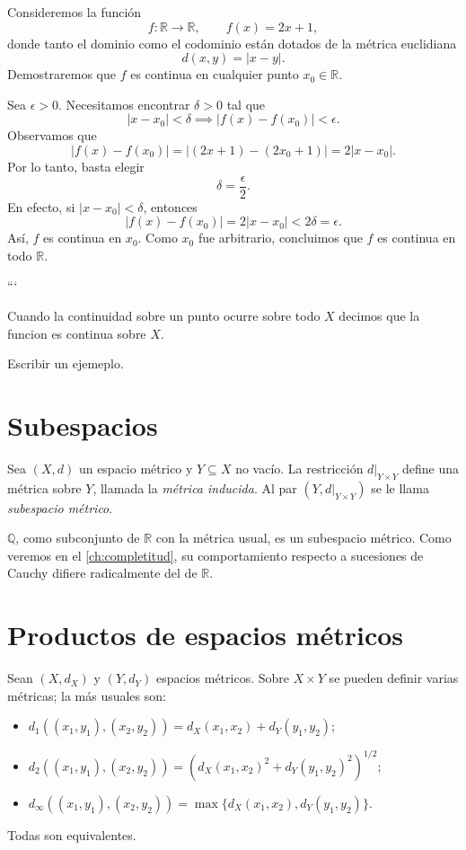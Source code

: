 \begin{example}
Consideremos la función
\[
f\colon \mathbb{R}\to\mathbb{R},
\qquad
f(x)=2x+1,
\]
donde tanto el dominio como el codominio están dotados de la métrica
euclidiana
\[
d(x,y)=|x-y|.
\]
Demostraremos que $f$ es continua en cualquier punto $x_0\in\mathbb{R}$.

Sea $\epsilon>0$. Necesitamos encontrar $\delta>0$ tal que
\[
|x-x_0|<\delta
\implies
|f(x)-f(x_0)|<\epsilon.
\]
Observamos que
\[
|f(x)-f(x_0)|
=
|(2x+1)-(2x_0+1)|
=
2|x-x_0|.
\]
Por lo tanto, basta elegir
\[
\delta=\frac{\epsilon}{2}.
\]
En efecto, si $|x-x_0|<\delta$, entonces
\[
|f(x)-f(x_0)|
=
2|x-x_0|
<
2\delta
=
\epsilon.
\]
Así, $f$ es continua en $x_0$. Como $x_0$ fue arbitrario, concluimos
que $f$ es continua en todo $\mathbb{R}$.
\end{example}
```


Cuando la continuidad sobre un punto ocurre sobre todo $X$ decimos que la funcion
es continua sobre $X$.
\begin{example}
  Escribir un ejemeplo. 
\end{example}

\section{Subespacios}

\begin{definition}
\label{def:subespacio}
Sea $(X,d)$ un espacio métrico y $Y\subseteq X$ no vacío. La restricción $d|_{Y\times Y}$ define una métrica sobre $Y$, llamada la \emph{métrica inducida}. Al par $(Y,d|_{Y\times Y})$ se le llama \emph{subespacio métrico}.
\end{definition}

\begin{example}
$\mathbb{Q}$, como subconjunto de $\mathbb{R}$ con la métrica usual, es un subespacio métrico. Como veremos en el \cref{ch:completitud}, su comportamiento respecto a sucesiones de Cauchy difiere radicalmente del de $\mathbb{R}$.
\end{example}

\section{Productos de espacios métricos}

\begin{definition}
\label{def:producto-metrico}
Sean $(X,d_X)$ y $(Y,d_Y)$ espacios métricos. Sobre $X\times Y$ se pueden definir varias métricas; la más usuales son:
\begin{itemize}
  \item $d_1((x_1,y_1),(x_2,y_2))=d_X(x_1,x_2)+d_Y(y_1,y_2)$;
  \item $d_2((x_1,y_1),(x_2,y_2))=(d_X(x_1,x_2)^2+d_Y(y_1,y_2)^2)^{1/2}$;
  \item $d_\infty((x_1,y_1),(x_2,y_2))=\max\{d_X(x_1,x_2),d_Y(y_1,y_2)\}$.
\end{itemize}
Todas son equivalentes.
\end{definition}

